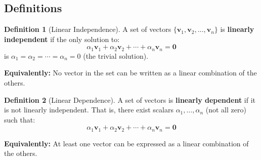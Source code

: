 \documentclass[12pt,a4paper]{article}
\theoremstyle{definition}
\newtheorem{definition}{Definition}[section]
\begin{document}
\subsection{Definitions}

\begin{definition}[Linear Independence]
A set of vectors $\{\mathbf{v}_1, \mathbf{v}_2, \ldots, \mathbf{v}_n\}$ is \textbf{linearly independent} if the only solution to:
\begin{equation}
\alpha_1\mathbf{v}_1 + \alpha_2\mathbf{v}_2 + \cdots + \alpha_n\mathbf{v}_n = \mathbf{0}
\end{equation}
is $\alpha_1 = \alpha_2 = \cdots = \alpha_n = 0$ (the trivial solution).

\textbf{Equivalently:} No vector in the set can be written as a linear combination of the others.
\end{definition}

\begin{definition}[Linear Dependence]
A set of vectors is \textbf{linearly dependent} if it is not linearly independent. That is, there exist scalars $\alpha_1, \ldots, \alpha_n$ (not all zero) such that:
\begin{equation}
\alpha_1\mathbf{v}_1 + \alpha_2\mathbf{v}_2 + \cdots + \alpha_n\mathbf{v}_n = \mathbf{0}
\end{equation}

\textbf{Equivalently:} At least one vector can be expressed as a linear combination of the others.
\end{definition}
\end{document}
